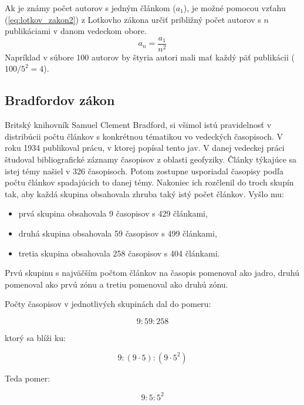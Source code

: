 Ak je známy počet autorov s jedným článkom ($a_1$), je možné pomocou vzťahu
(\ref{eq:lotkov_zakon2}) z Lotkovho zákona určiť približný počet autorov s $n$
publikáciami v danom vedeckom obore.
\begin{equation}
\label{eq:lotkov_zakon2}
a_n = \frac{a_1}{n^2}
\end{equation}
Napríklad v súbore 100 autorov by štyria autori mali mať každý päť publikácii
($100/5^2 = 4$).


\subsection{Bradfordov zákon}

Britský knihovník Samuel Clement Bradford, si všimol istú pravidelnosť v
distribúcii počtu článkov s konkrétnou tématikou vo vedeckých časopisoch.  V
roku 1934 publikoval prácu, v ktorej popísal tento jav.  V danej vedeckej práci
študoval bibliografické záznamy časopisov z oblasti geofyziky.  Články týkajúce
sa istej témy našiel v 326 časopisoch.  Potom zostupne usporiadal časopisy podľa
počtu článkov spadajúcich to danej témy.  Nakoniec ich rozčlenil do troch skupín
tak, aby každá skupina obsahovala zhruba taký istý počet článkov.  Vyšlo mu:

\begin{itemize}
\item prvá skupina obsahovala 9 časopisov s 429 článkami,
\item druhá skupina obsahovala 59 časopisov s 499 článkami,
\item tretia skupina obsahovala 258 časopisov s 404 článkami.
\end{itemize}

Prvú skupinu s najväčším počtom článkov na časopis pomenoval ako jadro, druhú
pomenoval ako prvú zónu a tretiu pomenoval ako druhú zónu.

Počty časopisov v jednotlivých skupinách dal do pomeru:

\begin{equation}
\label{eq:bradfordov_zakon1}
9 : 59 : 258
\end{equation}

ktorý sa blíži ku:

\begin{equation}
\label{eq:bradfordov_zakon2}
9 : (9 \cdot 5) : (9 \cdot 5^2)
\end{equation}

Teda pomer:

\begin{equation}
\label{eq:bradfordov_zakon3}
9 : 5 : 5^2
\end{equation}

